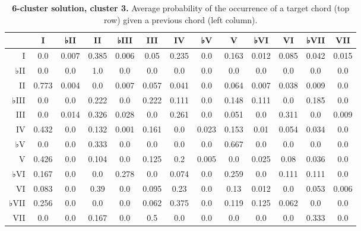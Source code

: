 \begin{table}[htbp]
\begin{minipage}{\linewidth}
\setlength{\tymax}{0.5\linewidth}
\centering
\small
\caption{\textbf{6-cluster solution, cluster 3.} Average probability of the occurrence of a target chord (top row) given a previous chord (left column).}
\label{6-clustersolutioncluster3.averageprobabilityoftheoccurrenceofatargetchordtoprowgivenapreviouschordleftcolumn.}
\begin{tabulary}{\textwidth}{@{}RCCCCCCCCCCCC@{}} \toprule
&I&♭II&II&♭III&III&IV&♭V&V&♭VI&VI&♭VII&VII\\
\midrule
I&0.0&0.007&0.385&0.006&0.05&0.235&0.0&0.163&0.012&0.085&0.042&0.015\\
♭II&0.0&0.0&1.0&0.0&0.0&0.0&0.0&0.0&0.0&0.0&0.0&0.0\\
II&0.773&0.004&0.0&0.007&0.057&0.041&0.0&0.064&0.007&0.038&0.009&0.0\\
♭III&0.0&0.0&0.222&0.0&0.222&0.111&0.0&0.148&0.111&0.0&0.185&0.0\\
III&0.0&0.014&0.326&0.028&0.0&0.261&0.0&0.051&0.0&0.311&0.0&0.009\\
IV&0.432&0.0&0.132&0.001&0.161&0.0&0.023&0.153&0.01&0.054&0.034&0.0\\
♭V&0.0&0.0&0.333&0.0&0.0&0.0&0.0&0.667&0.0&0.0&0.0&0.0\\
V&0.426&0.0&0.104&0.0&0.125&0.2&0.005&0.0&0.025&0.08&0.036&0.0\\
♭VI&0.167&0.0&0.0&0.278&0.0&0.074&0.0&0.259&0.0&0.111&0.111&0.0\\
VI&0.083&0.0&0.39&0.0&0.095&0.23&0.0&0.13&0.012&0.0&0.053&0.006\\
♭VII&0.256&0.0&0.0&0.0&0.062&0.375&0.0&0.119&0.125&0.062&0.0&0.0\\
VII&0.0&0.0&0.167&0.0&0.5&0.0&0.0&0.0&0.0&0.0&0.333&0.0\\

\bottomrule

\end{tabulary}
\end{minipage}
\end{table}

